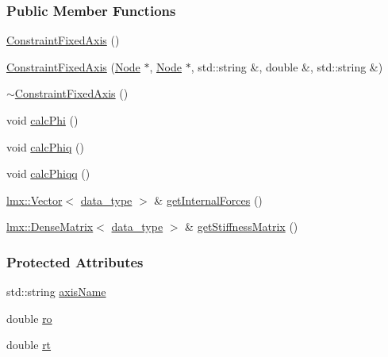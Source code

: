 \subsubsection*{Public Member Functions}
\begin{DoxyCompactItemize}
\item 
\hyperlink{classmknix_1_1_constraint_fixed_axis_ab385ca1886eda260208173abcfde6eaf}{Constraint\+Fixed\+Axis} ()
\item 
\hyperlink{classmknix_1_1_constraint_fixed_axis_aa12bf0a882d86295d28d6c414c4a9d5e}{Constraint\+Fixed\+Axis} (\hyperlink{classmknix_1_1_node}{Node} $\ast$, \hyperlink{classmknix_1_1_node}{Node} $\ast$, std\+::string \&, double \&, std\+::string \&)
\item 
\hyperlink{classmknix_1_1_constraint_fixed_axis_a51f651cd9693210d991b6b16b28a94c9}{$\sim$\+Constraint\+Fixed\+Axis} ()
\item 
void \hyperlink{classmknix_1_1_constraint_fixed_axis_ab5f59fd55877e45184aa90787479415c}{calc\+Phi} ()
\item 
void \hyperlink{classmknix_1_1_constraint_fixed_axis_a40970d2c0103244ac5e75307247d25b9}{calc\+Phiq} ()
\item 
void \hyperlink{classmknix_1_1_constraint_fixed_axis_a10444d42c4401cf093b221d59354ab8b}{calc\+Phiqq} ()
\item 
\hyperlink{classlmx_1_1_vector}{lmx\+::\+Vector}$<$ \hyperlink{namespacemknix_a16be4b246fbf2cceb141e3a179111020}{data\+\_\+type} $>$ \& \hyperlink{classmknix_1_1_constraint_fixed_axis_aad38af4a1571f59aa0e414109fd64275}{get\+Internal\+Forces} ()
\item 
\hyperlink{classlmx_1_1_dense_matrix}{lmx\+::\+Dense\+Matrix}$<$ \hyperlink{namespacemknix_a16be4b246fbf2cceb141e3a179111020}{data\+\_\+type} $>$ \& \hyperlink{classmknix_1_1_constraint_fixed_axis_aa2b8d2151a36dd140285a5a5e4f16967}{get\+Stiffness\+Matrix} ()
\end{DoxyCompactItemize}
\subsubsection*{Protected Attributes}
\begin{DoxyCompactItemize}
\item 
std\+::string \hyperlink{classmknix_1_1_constraint_fixed_axis_a71a1a8d7efc201a678dbfececa068ecb}{axis\+Name}
\item 
double \hyperlink{classmknix_1_1_constraint_fixed_axis_aaef8888c92c6fcba5d4644ab0cc8c984}{ro}
\item 
double \hyperlink{classmknix_1_1_constraint_fixed_axis_aae85721e0c2a16397b98fdb09ba72361}{rt}
\end{DoxyCompactItemize}


